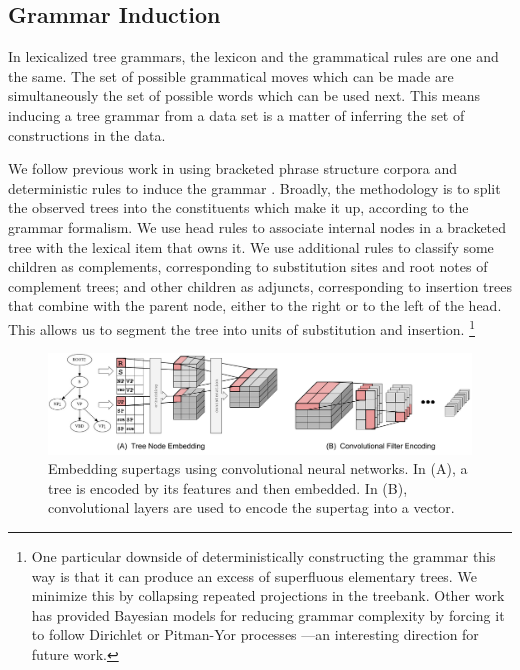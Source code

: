 \documentclass[11pt]{article}
\begin{document}
\subsection{Grammar Induction}

In lexicalized tree grammars, the lexicon and the grammatical rules
are one and the same.
%
The set of possible grammatical moves which can be made are simultaneously the set of possible words which can be used next.
%
This means inducing a tree grammar from a data set is a matter of inferring the set of constructions in the data.


We follow previous work in using bracketed phrase structure corpora
and deterministic rules to induce the grammar
\cite{bangalore2001impact,chiang2000statistical}.
%
Broadly, the methodology is to split the observed trees into the
constituents which make it up, according to the grammar formalism.
%
We use head rules
\cite{chiang2000statistical,collins1997three,magerman1995statistical}
to associate internal nodes in a bracketed tree with the lexical item
that owns it.
%
We use additional rules to classify some children as complements,
corresponding to substitution sites and root notes of complement
trees; and other children as adjuncts, corresponding to insertion
trees that combine with the parent node, either to the right or to the
left of the head.  This allows us to segment the tree into units of
substitution and insertion.%
\footnote{One particular downside of deterministically constructing
  the grammar this way is that it can produce an excess of superfluous
  elementary trees.
%
We minimize this by collapsing repeated projections in the treebank.
%
Other work has provided Bayesian models for reducing grammar
complexity by forcing it to follow Dirichlet or Pitman-Yor processes
\cite{Cohn2010}---an interesting direction for future work.}



\begin{figure}[tH!]
\centering
\includegraphics[width=\textwidth]{spineembed.pdf}
\caption{Embedding supertags using convolutional neural networks. In (A), a tree is encoded by its features and then embedded.
 In (B), convolutional layers are used to encode the supertag into a vector.}
 \label{fig:spineembedding}
\end{figure}
\end{document}
